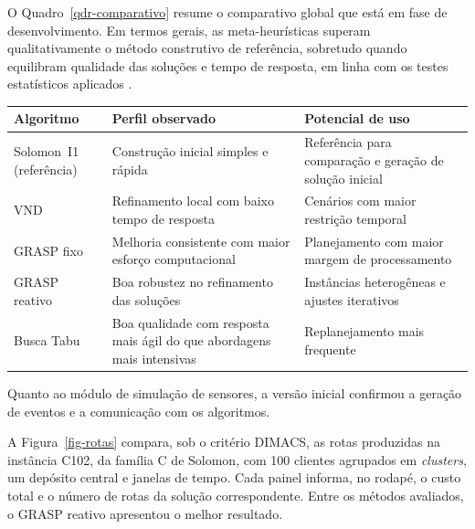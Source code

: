 \documentclass[12pt, a4paper]{article}
\begin{document}
O Quadro~\ref{qdr-comparativo} resume o comparativo global que está em fase de desenvolvimento. Em termos gerais, as meta-heurísticas superam qualitativamente o método construtivo de referência, sobretudo quando equilibram qualidade das soluções e tempo de resposta, em linha com os testes estatísticos aplicados \citep{demsar2006statistical}.

\begin{quadro}[H]
    \centering
    \caption{Síntese qualitativa do comparativo entre os algoritmos implementados}
    \label{qdr-comparativo}
    \fontsize{10}{12}\selectfont
    \begin{tabular}{|p{30mm}|p{60mm}|p{50mm}|}
        \hline
        \rowcolor{gray!25}
        \centering\textbf{Algoritmo} & \centering\textbf{Perfil observado} & \centering\textbf{Potencial de uso} \tabularnewline
        \hline
        \mbox{Solomon I1} \mbox{(referência)} & Construção inicial simples e rápida & Referência para comparação e geração de solução inicial \\
        \hline
        VND & Refinamento local com baixo tempo de resposta & Cenários com maior restrição temporal \\
        \hline
        GRASP fixo & Melhoria consistente com maior esforço computacional & Planejamento com maior margem de processamento \\
        \hline
        GRASP reativo & Boa robustez no refinamento das soluções & Instâncias heterogêneas e ajustes iterativos \\
        \hline
        Busca Tabu & Boa qualidade com resposta mais ágil do que abordagens mais intensivas & Replanejamento mais frequente \\
        \hline
    \end{tabular}
    \vspace{5pt}
    \caption*{Fonte: Produção da própria autora.}
    \caption*{\textit{Descrição do Quadro~\ref{qdr-comparativo}:} quadro com cinco linhas, uma por algoritmo, sintetizando o perfil de desempenho observado e seu potencial de aplicação no contexto do roteamento com janelas de tempo.}
\end{quadro}

Quanto ao módulo de simulação de sensores, a versão inicial confirmou a geração de eventos e a comunicação com os algoritmos. 

A Figura~\ref{fig-rotas} compara, sob o critério DIMACS, as rotas produzidas na instância C102, da família C de Solomon, com 100 clientes agrupados em \textit{clusters}, um depósito central e janelas de tempo. Cada painel informa, no rodapé, o custo total e o número de rotas da solução correspondente. Entre os métodos avaliados, o GRASP reativo apresentou o melhor resultado.
\end{document}
